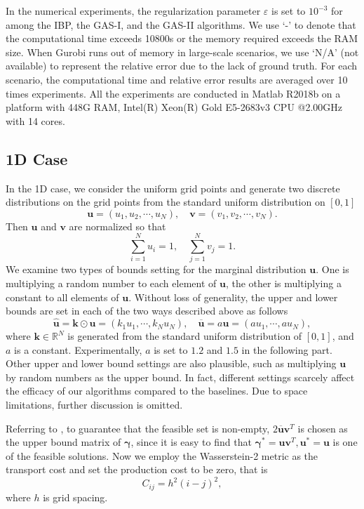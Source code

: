 \documentclass[review,hidelinks,onefignum,onetabnum]{siamart220329}
\begin{document}
In the numerical experiments, the regularization parameter $\varepsilon$ is set to $10^{-3}$ for among the IBP, the GAS-I, and the GAS-II algorithms. We use `-' to denote that the computational time exceeds 10800s or the memory required exceeds the RAM size. When Gurobi runs out of memory in large-scale scenarios, we use `N/A' (not available) to represent the relative error due to the lack of ground truth. For each scenario, the computational time and relative error results are averaged over 10 times experiments. All the experiments are conducted in Matlab R2018b on a platform with 448G RAM, Intel(R) Xeon(R) Gold E5-2683v3 CPU @2.00GHz with 14 cores. 

\subsection{1D Case}

In the 1D case, we consider the uniform grid points and generate two discrete distributions on the grid points from the standard uniform distribution on $[0,1]$
$$\bm{u}=(u_1, u_2, \cdots,u_{N}), \quad \bm{v}=(v_1,v_2,\cdots,v_{N}).$$ Then $\bm{u}$ and $\bm{v}$ are normalized so that 
$$\sum_{i=1}^{N}u_i=1,\quad \sum_{j=1}^{N}v_j=1.$$
We examine two types of bounds setting for the marginal distribution $\bm{u}$. One is multiplying a random number to each element of $\bm{u}$, the other is multiplying a constant to all elements of $\bm{u}$.
Without loss of generality, the upper and lower bounds are set in each of the two ways described above as follows
$$\bm{\hat{u}}=\bm{k}\odot \bm{u} = \left(k_1 u_1, \cdots, k_N u_N\right), \quad \bm{\overline{u}}= a\bm{u}=\left( a u_1, \cdots, a u_N\right), $$
where $\bm{k}\in \mathbb{R}^{N}$ is generated from the standard uniform distribution of $[0,1]$, and $a$ is a constant. 
Experimentally, $a$ is set to $1.2$ and $1.5$ in the following part. 
Other upper and lower bound settings are also plausible, such as multiplying $\bm{u}$ by random numbers as the upper bound. In fact, different settings scarcely affect the efficacy of our algorithms compared to the baselines. Due to space limitations, further discussion is omitted.


Referring to \cite{wu2022double}, to guarantee that
the feasible set is non-empty, $2\bm{\overline{u}}\bm{v}^T$ is chosen as the upper bound matrix of $\bm{\gamma}$, since it is easy to find that $\bm{\gamma}^*=\bm{u}\bm{v}^T, \bm{u}^*=\bm{u}$ is one of the feasible solutions. 
Now we employ the Wasserstein-2 metric as the transport cost and set the production cost to be zero, that is 
$$C_{ij}=h^2(i-j)^2,$$
where $h$ is grid spacing.
\end{document}
